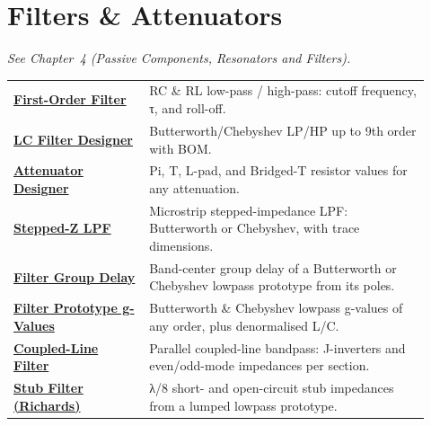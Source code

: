 \section*{Filters \& Attenuators}
\noindent\emph{See Chapter~4 (Passive Components, Resonators and Filters).}
\begin{longtable}{>{\raggedright\arraybackslash}p{0.30\linewidth}>{\raggedright\arraybackslash}p{0.62\linewidth}}
\hline
\href{https://rftoolbox.ca/RCFilter.html}{\textbf{First-Order Filter}} & RC \& RL low-pass / high-pass: cutoff frequency, τ, and roll-off. \\
\href{https://rftoolbox.ca/FilterDesign.html}{\textbf{LC Filter Designer}} & Butterworth/Chebyshev LP/HP up to 9th order with BOM. \\
\href{https://rftoolbox.ca/AttenuatorDesign.html}{\textbf{Attenuator Designer}} & Pi, T, L-pad, and Bridged-T resistor values for any attenuation. \\
\href{https://rftoolbox.ca/SteppedImpedanceLPF.html}{\textbf{Stepped-Z LPF}} & Microstrip stepped-impedance LPF: Butterworth or Chebyshev, with trace dimensions. \\
\href{https://rftoolbox.ca/GroupDelay.html}{\textbf{Filter Group Delay}} & Band-center group delay of a Butterworth or Chebyshev lowpass prototype from its poles. \\
\href{https://rftoolbox.ca/FilterPrototype.html}{\textbf{Filter Prototype g-Values}} & Butterworth \& Chebyshev lowpass g-values of any order, plus denormalised L/C. \\
\href{https://rftoolbox.ca/CoupledLineFilter.html}{\textbf{Coupled-Line Filter}} & Parallel coupled-line bandpass: J-inverters and even/odd-mode impedances per section. \\
\href{https://rftoolbox.ca/StubFilter.html}{\textbf{Stub Filter (Richards)}} & λ/8 short- and open-circuit stub impedances from a lumped lowpass prototype. \\
\hline
\end{longtable}

